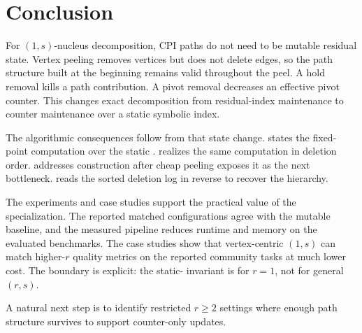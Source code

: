 \section{Conclusion}\label{sec:conclusion}

For \((1,s)\)-nucleus decomposition, CPI paths do not need to be mutable residual state.
%
Vertex peeling removes vertices but does not delete edges, so the path structure built at the beginning remains valid throughout the peel.
%
A hold removal kills a path contribution.
%
A pivot removal decreases an effective pivot counter.
%
This changes exact decomposition from residual-index maintenance to counter maintenance over a static symbolic index.

The algorithmic consequences follow from that state change.
%
\localH{} states the fixed-point computation over the static \cpi{}.
%
\peelH{} realizes the same computation in deletion order.
%
\paraBuild{} addresses construction after cheap peeling exposes it as the next bottleneck.
%
\buildHier{} reads the sorted deletion log in reverse to recover the hierarchy.

The experiments and case studies support the practical value of the specialization.
%
The reported matched configurations agree with the mutable baseline, and the measured pipeline reduces runtime and memory on the evaluated benchmarks.
%
The case studies show that vertex-centric \((1,s)\) can match higher-\(r\) quality metrics on the reported community tasks at much lower cost.
%
The boundary is explicit: the static-\cpi{} invariant is for \(r=1\), not for general \((r,s)\).

A natural next step is to identify restricted \(r\ge2\) settings where enough path structure survives to support counter-only updates.
